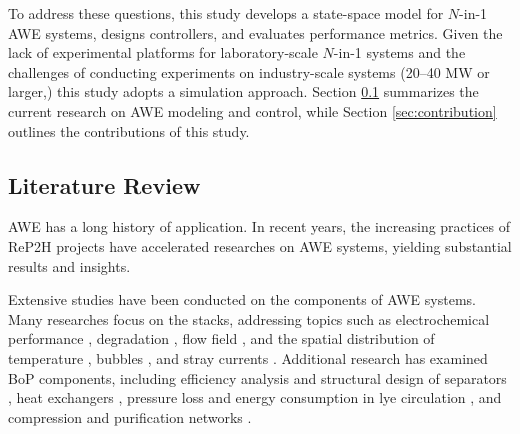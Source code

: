 \documentclass[review,3p,10pt]{elsarticle}
\begin{document}
To address these questions, this study develops a state-space model for $N$-in-1 AWE systems, designs controllers, and evaluates performance metrics. Given the lack of experimental platforms for laboratory-scale $N$-in-1 systems and the challenges of conducting experiments on industry-scale systems (20--40 MW or larger,) %
this study adopts a simulation approach. %
Section \ref{sec:review} summarizes the current research on AWE modeling and control, while Section \ref{sec:contribution} outlines the contributions of this study.

\subsection{Literature Review}
\label{sec:review}

AWE has a long history of application. In recent years, the increasing practices of ReP2H projects have accelerated %
researches on AWE systems, yielding substantial results and insights.

Extensive studies have been conducted on the components of AWE systems. Many researches focus on the stacks, addressing topics such as electrochemical performance \cite{sanchez2018semi,huang2022multiphysics}, degradation \cite{esfandiari2024metal}, flow field \cite{wang2023non}, and the spatial distribution of temperature \cite{zhang2024temperature}, bubbles \cite{cao2024investigation}, and stray currents \cite{qi2023channel,sakas2024influence,dogan2024experimental}. Additional research has examined BoP components, including efficiency analysis and structural design of separators \cite{wang2022experimental,zeng2020experimental,hu2024study}, heat exchangers \cite{rashidi2022progress,jiang2024performance}, pressure loss and energy consumption in lye circulation \cite{qi2023channel}, and compression and purification networks \cite{kang2018optimal}.
\end{document}
